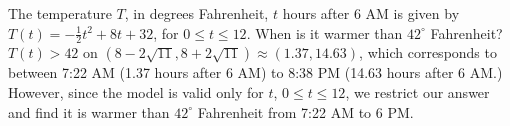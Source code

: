 {The temperature $T$, in degrees Fahrenheit, $t$ hours after 6 AM is given by $T(t) = -\frac{1}{2} t^2 + 8t+32$, for $0 \leq t \leq 12$.  When is it warmer than $42^{\circ}$ Fahrenheit?}
{ $T(t) > 42$ on  $(8-2\sqrt{11}, 8+2\sqrt{11}) \approx (1.37, 14.63)$, which corresponds to between 7:22 AM (1.37 hours after 6 AM) to 8:38 PM (14.63 hours after 6 AM.)  However, since the model is valid only for $t$, $0 \leq t \leq 12$, we restrict our answer and find it is warmer than $42^{\circ}$ Fahrenheit from 7:22 AM to 6 PM. }